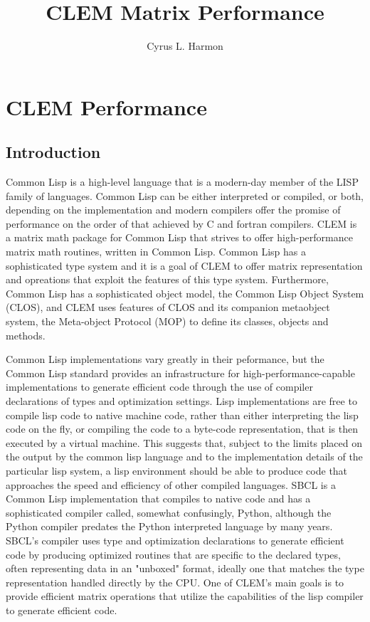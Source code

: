 \documentclass[10pt]{article}
\title{CLEM Matrix Performance}
\author{Cyrus L. Harmon}
\begin{document}
\maketitle
\let\mypdfximage\pdfximage
\def\pdfximage{\immediate\mypdfximage}
\baselineskip14pt


\clearpage
\section{CLEM Performance}
\baselineskip12pt
\subsection{Introduction}
\baselineskip14pt
Common Lisp is a high-level language that is a modern-day
     member of the LISP family of languages. Common Lisp can be
     either interpreted or compiled, or both, depending on the
     implementation and modern compilers offer the promise of
     performance on the order of that achieved by C and fortran
     compilers. CLEM is a matrix math package for Common Lisp that
     strives to offer high-performance matrix math routines, written
     in Common Lisp. Common Lisp has a sophisticated type system and
     it is a goal of CLEM to offer matrix representation and
     opreations that exploit the features of this type
     system. Furthermore, Common Lisp has a sophisticated object
     model, the Common Lisp Object System (CLOS), and CLEM uses
     features of CLOS and its companion metaobject system, the
     Meta-object Protocol (MOP) to define its classes, objects and
     methods.

Common Lisp implementations vary greatly in their
     peformance, but the Common Lisp standard provides an
     infrastructure for high-performance-capable implementations
     to generate efficient code through the use of compiler
     declarations of types and optimization settings. Lisp
     implementations are free to compile lisp code to native
     machine code, rather than either interpreting the lisp code
     on the fly, or compiling the code to a byte-code
     representation, that is then executed by a virtual
     machine. This suggests that, subject to the limits placed on
     the output by the common lisp language and to the
     implementation details of the particular lisp system, a lisp
     environment should be able to produce code that approaches
     the speed and efficiency of other compiled languages. SBCL
     is a Common Lisp implementation that compiles to native code
     and has a sophisticated compiler called, somewhat
     confusingly, Python, although the Python compiler predates
     the Python interpreted language by many years. SBCL's compiler
     uses type and optimization declarations to generate efficient
     code by producing optimized routines that are specific to the
     declared types, often representing data in an "unboxed" format,
     ideally one that matches the type representation handled directly
     by the CPU. One of CLEM's main goals is to provide efficient
     matrix operations that utilize the capabilities of the lisp
     compiler to generate efficient code.
\end{document}
